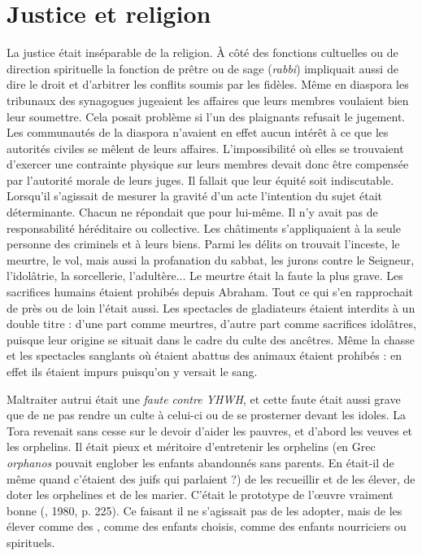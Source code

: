 \section{Justice et religion}

 La justice était inséparable de la religion. À côté des fonctions cultuelles ou de direction spirituelle la fonction de prêtre ou de sage (\emph{rabbi}) impliquait aussi de dire le droit et d'arbitrer les conflits soumis par les fidèles. Même en diaspora les tribunaux des synagogues jugeaient les affaires que leurs membres voulaient bien leur soumettre. Cela posait problème si l'un des plaignants refusait le jugement. Les communautés de la diaspora n'avaient en effet aucun intérêt à ce que les autorités civiles se mêlent de leurs affaires. L'impossibilité où elles se trouvaient d'exercer une contrainte physique sur leurs membres devait donc être compensée par l'autorité morale de leurs juges. Il fallait que leur équité soit indiscutable. Lorsqu'il s'agissait de mesurer la gravité d'un acte l'intention du sujet était déterminante. Chacun ne répondait que pour lui-même. Il n'y avait pas de responsabilité héréditaire ou collective. Les châtiments s'appliquaient à la seule personne des criminels et à leurs biens. Parmi les délits on trouvait l'inceste, le meurtre, le vol, mais aussi la profanation du sabbat, les jurons contre le Seigneur, l'idolâtrie, la sorcellerie, l'adultère... Le meurtre était la faute la plus grave. Les sacrifices humains étaient prohibés depuis Abraham. Tout ce qui s'en rapprochait de près ou de loin l'était aussi. Les spectacles de gladiateurs étaient interdits à un double titre : d'une part comme meurtres, d'autre part comme sacrifices idolâtres, puisque leur origine se situait dans le cadre du culte des ancêtres. Même la chasse et les spectacles sanglants où étaient abattus des animaux étaient prohibés : en effet ils étaient impurs puisqu'on y versait le sang. 

 Maltraiter autrui était une \emph{faute contre YHWH}, et cette faute était aussi grave que de ne pas rendre un culte à celui-ci ou de se prosterner devant les idoles. La Tora revenait sans cesse sur le devoir d'aider les pauvres, et d'abord les veuves et les orphelins. Il était pieux et méritoire d'entretenir les orphelins (en Grec \emph{orphanos} pouvait englober les enfants abandonnés sans parents. En était-il de même quand c'étaient des juifs qui parlaient ?) de les recueillir et de les élever, de doter les orphelines et de les marier. C'était le prototype de l'œuvre vraiment bonne (, 1980, p. 225). Ce faisant il ne s'agissait pas de les adopter, mais de les élever comme des , comme des enfants choisis, comme des enfants nourriciers ou spirituels. 

